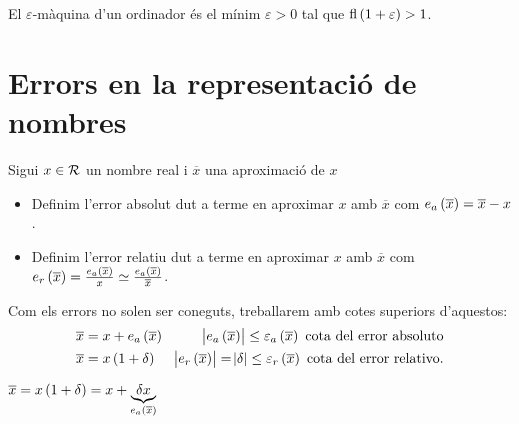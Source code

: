 \begin{defi}
	El $\varepsilon$-màquina d'un ordinador és el mínim $\varepsilon > 0$ tal que $\text{fl}\left( 1 + \varepsilon\right)  > 1$.
\end{defi}
        
\section{Errors en la representació de nombres}

\begin{defi}
    Sigui $x \in \mathcal{R}$ un nombre real i $\overline{x}$ una aproximació de $x$
    \begin{itemize}
	\item Definim l'error absolut dut a terme en aproximar $x$ amb $\overline{x}$ com $e_a\left( \overline{x}\right)  = \overline{x} - x$.
	\item Definim l'error relatiu dut a terme en aproximar $x$ amb $\overline{x}$ com
	$e_r\left( \overline{x}\right)  = \frac{e_a\left( \overline{x}\right) }{x} \simeq \frac{e_a\left( \overline{x}\right) }{\overline{x}}$.
    \end{itemize}
\end{defi}

\begin{obs}
   Com els errors no solen ser coneguts, treballarem amb cotes superiors d'aquestos:
   \begin{align*}
	\overline{x} &= x + e_a\left( \overline{x}\right)  & \abs{e_a\left( \overline{x}\right) } \leq \varepsilon_a\left( \overline{x}\right)  \text{ cota del error absoluto} \\
	\overline{x} &= x\left( 1 + \delta\right)  & \abs{e_r\left( \overline{x}\right) }=\abs{\delta} \leq \varepsilon_r\left( \overline{x}\right)  \text{ cota del error relativo}.
    \end{align*}
\end{obs}

\begin{obs}
    $\overline{x} = x\left( 1 + \delta\right)  = x + \underbrace{\delta x}_{e_a\left( \overline{x}\right) }$
\end{obs}
  
